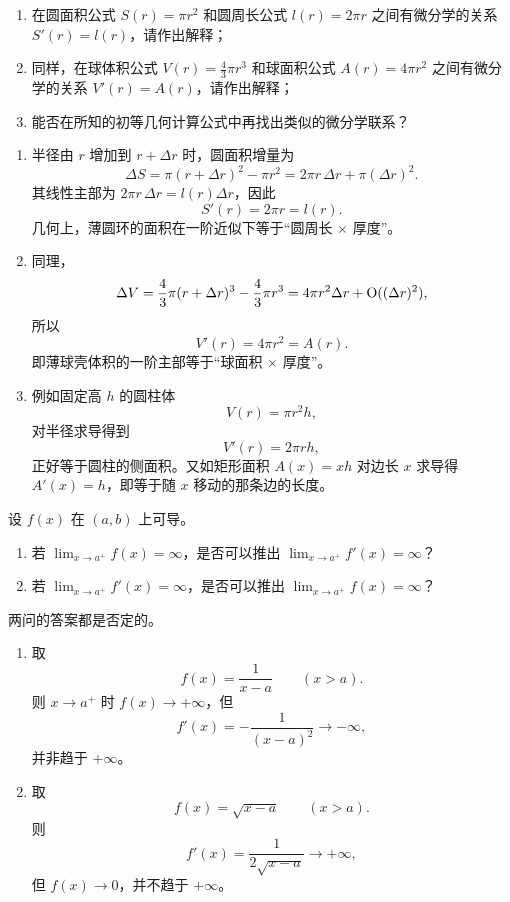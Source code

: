 \begin{xthought}[7]
\begin{enumerate}[label=(\arabic*)]
    \item 在圆面积公式 $S(r)=\pi r^2$ 和圆周长公式 $l(r)=2\pi r$ 之间有微分学的关系 $S'(r)=l(r)$，请作出解释；
    \item 同样，在球体积公式 $V(r)=\frac43\pi r^3$ 和球面积公式 $A(r)=4\pi r^2$ 之间有微分学的关系 $V'(r)=A(r)$，请作出解释；
    \item 能否在所知的初等几何计算公式中再找出类似的微分学联系？
  \end{enumerate}
\end{xthought}
\begin{xsolution}
\begin{enumerate}[label=(\arabic*)]
  \item 半径由 $r$ 增加到 $r+\Delta r$ 时，圆面积增量为
  \[
    \Delta S=\pi(r+\Delta r)^2-\pi r^2
    =2\pi r\,\Delta r+\pi(\Delta r)^2.
  \]
  其线性主部为 $2\pi r\,\Delta r=l(r)\Delta r$，因此
  \[
    S'(r)=2\pi r=l(r).
  \]
  几何上，薄圆环的面积在一阶近似下等于“圆周长 $\times$ 厚度”。

  \item 同理，
  \[
    \Delta V=\frac43\pi(r+\Delta r)^3-\frac43\pi r^3
    =4\pi r^2\Delta r+\mathrm{O}((\Delta r)^2),
  \]
  所以
  \[
    V'(r)=4\pi r^2=A(r).
  \]
  即薄球壳体积的一阶主部等于“球面积 $\times$ 厚度”。

  \item 例如固定高 $h$ 的圆柱体
  \[
    V(r)=\pi r^2h,
  \]
  对半径求导得到
  \[
    V'(r)=2\pi rh,
  \]
  正好等于圆柱的侧面积。又如矩形面积 $A(x)=xh$ 对边长 $x$ 求导得 $A'(x)=h$，即等于随 $x$ 移动的那条边的长度。
\end{enumerate}
\end{xsolution}


\begin{xthought}[8]
设 $f(x)$ 在 $(a,b)$ 上可导。
  \begin{enumerate}[label=(\arabic*)]
    \item 若 $\lim_{x\to a^+}f(x)=\infty$，是否可以推出 $\lim_{x\to a^+}f'(x)=\infty$？
    \item 若 $\lim_{x\to a^+}f'(x)=\infty$，是否可以推出 $\lim_{x\to a^+}f(x)=\infty$？
  \end{enumerate}
\end{xthought}
\begin{xsolution}
两问的答案都是否定的。
\begin{enumerate}[label=(\arabic*)]
  \item 取
  \[
    f(x)=\frac1{x-a}\qquad(x>a).
  \]
  则 $x\to a^+$ 时 $f(x)\to+\infty$，但
  \[
    f'(x)=-\frac1{(x-a)^2}\to-\infty,
  \]
  并非趋于 $+\infty$。

  \item 取
  \[
    f(x)=\sqrt{x-a}\qquad(x>a).
  \]
  则
  \[
    f'(x)=\frac1{2\sqrt{x-a}}\to+\infty,
  \]
  但 $f(x)\to0$，并不趋于 $+\infty$。
\end{enumerate}
\end{xsolution}


